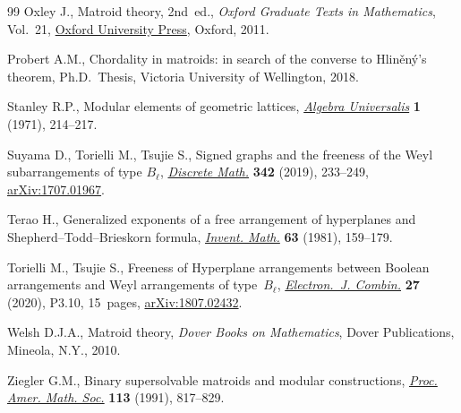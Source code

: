 \documentclass[11pt]{article}
\begin{document}
\begin{thebibliography}{99}
Oxley J., Matroid theory, 2nd~ed., \textit{Oxford Graduate Texts in Mathematics},
 Vol.~21, \href{https://doi.org/10.1093/acprof:oso/9780198566946.001.0001}{Oxford University Press}, Oxford, 2011.

Probert A.M., Chordality in matroids: in search of the converse to
 {H}lin\v{e}n\'y's theorem, Ph.D.~Thesis, {V}ictoria University of Wellington, 2018.

Stanley R.P., Modular elements of geometric lattices, \href{https://doi.org/10.1007/BF02944981}{\textit{Algebra
 Universalis}} \textbf{1} (1971), 214--217.

Suyama D., Torielli M., Tsujie S., Signed graphs and the freeness of the {W}eyl
 subarrangements of type {$B_\ell$}, \href{https://doi.org/10.1016/j.disc.2018.09.029}{\textit{Discrete Math.}} \textbf{342}
 (2019), 233--249, \href{https://arxiv.org/abs/1707.01967}{arXiv:1707.01967}.

Terao H., Generalized exponents of a free arrangement of hyperplanes and
 {S}hepherd--{T}odd--{B}rieskorn formula, \href{https://doi.org/10.1007/BF01389197}{\textit{Invent. Math.}} \textbf{63}
 (1981), 159--179.

Torielli M., Tsujie S., Freeness of Hyperplane arrangements between {B}oolean
 arrangements and {W}eyl arrangements of type~$B_\ell$, \href{https://doi.org/10.37236/9341}{\textit{Electron.~J.
 Combin.}} \textbf{27} (2020), P3.10, 15~pages, \href{https://arxiv.org/abs/1807.02432}{arXiv:1807.02432}.

Welsh D.J.A., Matroid theory, \textit{Dover Books on Mathematics}, Dover Publications,
 Mineola, N.Y., 2010.

Ziegler G.M., Binary supersolvable matroids and modular constructions,
 \href{https://doi.org/10.2307/2048620}{\textit{Proc. Amer. Math. Soc.}} \textbf{113} (1991), 817--829.

\end{thebibliography}
\end{document}
